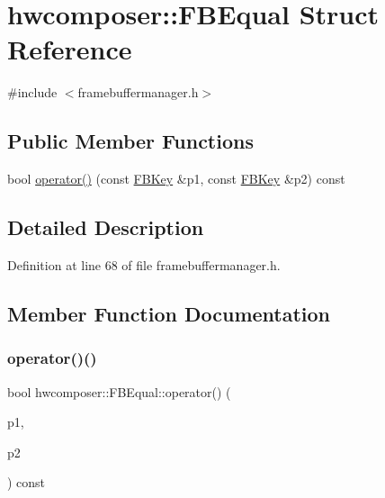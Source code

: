 \hypertarget{structhwcomposer_1_1FBEqual}{}\section{hwcomposer\+:\+:F\+B\+Equal Struct Reference}
\label{structhwcomposer_1_1FBEqual}


{\ttfamily \#include $<$framebuffermanager.\+h$>$}

\subsection*{Public Member Functions}
\begin{DoxyCompactItemize}
\item 
bool \mbox{\hyperlink{structhwcomposer_1_1FBEqual_ab9a95e7c00167cf1c81c8164868040ae}{operator()}} (const \mbox{\hyperlink{structFBKey}{F\+B\+Key}} \&p1, const \mbox{\hyperlink{structFBKey}{F\+B\+Key}} \&p2) const
\end{DoxyCompactItemize}


\subsection{Detailed Description}


Definition at line 68 of file framebuffermanager.\+h.



\subsection{Member Function Documentation}
\mbox{\label{structhwcomposer_1_1FBEqual_ab9a95e7c00167cf1c81c8164868040ae}} 
\subsubsection{\texorpdfstring{operator()()}{operator()()}}
{\footnotesize\ttfamily bool hwcomposer\+::\+F\+B\+Equal\+::operator() (\begin{DoxyParamCaption}\item[{const \mbox{\hyperlink{structFBKey}{F\+B\+Key}} \&}]{p1,  }\item[{const \mbox{\hyperlink{structFBKey}{F\+B\+Key}} \&}]{p2 }\end{DoxyParamCaption}) const\hspace{0.3cm}{\ttfamily [inline]}}



